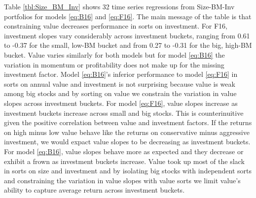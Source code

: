 
Table \ref{tbl:Size_BM_Inv} shows 32 time series regressions from Size-BM-Inv
portfolios for models \ref{eq:B16} and \ref{eq:F16}.
The main message of the table is that constraining value decreases performance
in sorts on investment.
For F16, investment slopes vary considerably across investment buckets, ranging
from 0.61 to -0.37 for the small, low-BM bucket and from 0.27 to -0.31 for the
big, high-BM bucket.
Value varies similarly for both models but for model \ref{eq:B16} the variation
in momentum or profitability does not make up for the missing investment
factor.
Model \ref{eq:B16}'s inferior performance to model \ref{eq:F16} in sorts on
annual value and investment is not surprising because value is weak among
big stocks and by sorting on value we constrain the variation in value slopes
across investment buckets.
For model \ref{eq:F16}, value slopes increase as investment buckets increase
across small and big stocks.
This is counterinuitive given the positive correlation between value and
investment factors.
If the returns on high minus low value behave like the returns on conservative
minus aggressive investment, we would expact value slopes to be decreasing as
investment buckets.
For model \ref{eq:B16}, value slopes behave more as expected and they decrease
or exhibit a frown as investment buckets increase.
Value took up most of the slack in sorts on size and investment and by
isolating big stocks with independent sorts and constraining the variation in
value slopes with value sorts we limit value's ability to capture average
return across investment buckets.
